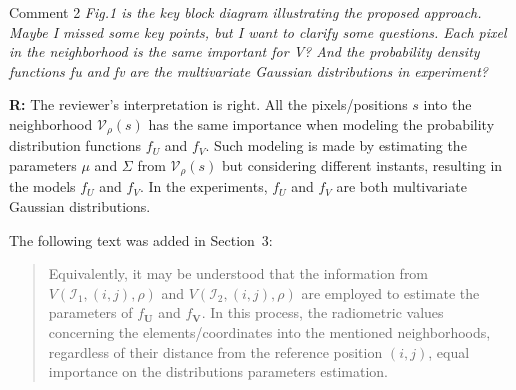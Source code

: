 \documentclass[11pt]{report}
\begin{document}
\vspace{0.3cm}





\medskip
\begin{mybox}{Comment 2}
\textit{Fig.1 is the key block diagram illustrating the proposed approach. Maybe I missed some key points, but I want to clarify some questions. Each pixel in the neighborhood is the same important for V? And the probability density functions fu and fv are the multivariate Gaussian distributions in experiment?}

\medskip

\textbf{R:} The reviewer's interpretation is right. All the pixels/positions $s$ into the neighborhood $\mathcal{V}_{\rho}(s)$ has the same importance when modeling the probability distribution functions $f_U$ and $f_V$. Such modeling is made by estimating the parameters $\mu$ and $\Sigma$ from $\mathcal{V}_{\rho}(s)$ but considering different instants, resulting in the models $f_U$ and $f_V$. In the experiments, $f_U$ and $f_V$ are both multivariate Gaussian distributions.

\medskip

The following text was added in Section~3:
\begin{quotation}

Equivalently, it may be understood that the information from $V(\mathcal{I}_1,(i,j),\rho)$ and $V(\mathcal{I}_2,(i,j),\rho)$ are employed to estimate the parameters of $f_{\mathbf{U}}$ and $f_{\mathbf{V}}$. 
In this process, the radiometric values concerning the elements/coordinates into the mentioned neighborhoods, regardless of their distance from the reference position $(i,j)$, equal importance on the distributions parameters estimation.

\end{quotation}


\end{mybox}

\vspace{0.3cm}
\end{document}

